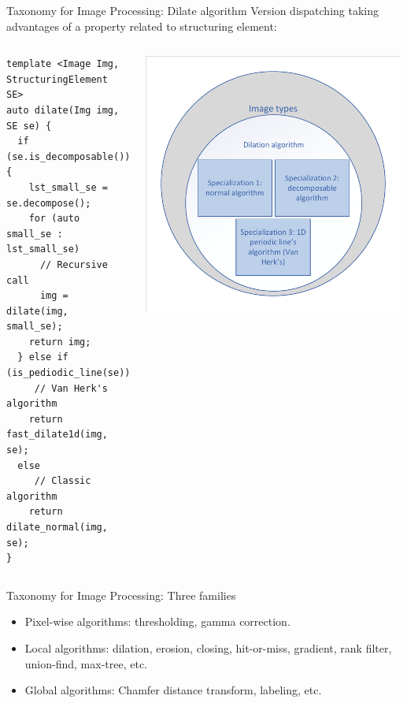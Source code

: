 \documentclass[12pt,aspectratio=169]{beamer}
\begin{document}
\begin{frame}[fragile]{Taxonomy for Image Processing: Dilate algorithm}
  Version dispatching taking advantages of a property related to structuring element:
  \begin{columns}[T,onlytextwidth]
    \begin{verbatim}
template <Image Img, StructuringElement SE>
auto dilate(Img img, SE se) {
  if (se.is_decomposable()) {
    lst_small_se = se.decompose();
    for (auto small_se : lst_small_se)
      // Recursive call
      img = dilate(img, small_se);
    return img;
  } else if (is_pediodic_line(se))
     // Van Herk's algorithm
    return fast_dilate1d(img, se);
  else
     // Classic algorithm
    return dilate_normal(img, se);
}
\end{verbatim}

    \includegraphics[width=0.99\textwidth]{../figures/dilation_specialization_diagram}
  \end{columns}
\end{frame}

\begin{frame}[fragile]{Taxonomy for Image Processing: Three families}
  \begin{itemize}
    \item Pixel-wise algorithms: thresholding, gamma correction.
    \item Local algorithms: dilation, erosion, closing, hit-or-miss, gradient, rank filter, union-find, max-tree, etc.
    \item Global algorithms: Chamfer distance transform, labeling, etc.
  \end{itemize}
\end{frame}
\end{document}
